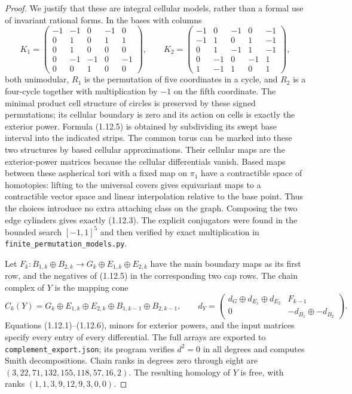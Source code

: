 \begin{proof}
We justify that these are integral cellular models, rather than a
formal use of invariant rational forms.  In the bases with columns
\[
K_1=\begin{pmatrix}
-1&-1&0&-1&0\\0&1&0&1&1\\0&1&0&0&0\\
0&-1&-1&0&-1\\0&0&1&0&0
\end{pmatrix},\qquad
K_2=\begin{pmatrix}
-1&0&-1&0&-1\\-1&1&0&1&-1\\0&1&-1&1&-1\\
0&-1&0&-1&1\\1&-1&1&0&1
\end{pmatrix},
\]
both unimodular, $R_1$ is the permutation of five coordinates in a
cycle, and $R_2$ is a four-cycle together with multiplication by $-1$
on the fifth coordinate.  The minimal product cell structure of
circles is preserved by these signed permutations; its cellular
boundary is zero and its action on cells is exactly the exterior
power.  Formula (1.12.5) is obtained by subdividing its swept
base interval into the indicated strips.  The common torus can be
marked into these two structures by based cellular approximations.
Their cellular maps are the exterior-power matrices because the
cellular differentials vanish.  Based maps between these aspherical
tori with a fixed map on $\pi_1$ have a contractible space of
homotopies: lifting to the universal covers gives equivariant maps
to a contractible vector space and linear interpolation relative to
the base point.  Thus the choices introduce no extra attaching class
on the graph.  Composing the two edge cylinders gives exactly
(1.12.3).  The explicit conjugators were found in the bounded search
$[-1,1]^5$ and then verified by exact multiplication in
\texttt{finite\_permutation\_models.py}.

Let $F_k:B_{1,k}\oplus B_{2,k}\to G_k\oplus E_{1,k}\oplus E_{2,k}$
have the main boundary maps as its first row, and the negatives of
(1.12.5) in the corresponding two cap rows.  The chain complex of
$Y$ is the mapping cone
\[
C_k(Y)=G_k\oplus E_{1,k}\oplus E_{2,k}
       \oplus B_{1,k-1}\oplus B_{2,k-1},\qquad
d_Y=\begin{pmatrix}d_G\oplus d_{E_1}\oplus d_{E_2}&F_{k-1}\\
0&-d_{B_1}\oplus-d_{B_2}\end{pmatrix}.
\tag{1.12.6}
\]
Equations (1.12.1)--(1.12.6), minors for exterior powers, and the input
matrices specify every entry of every differential.
The full arrays are exported to \texttt{complement\_export.json}; its
program verifies $d^2=0$ in all degrees and computes Smith
decompositions.  Chain ranks in degrees zero through eight are
$(3,22,71,132,155,118,57,16,2)$.
The resulting homology of $Y$ is free, with ranks
$(1,1,3,9,12,9,3,0,0)$.


\end{proof}
